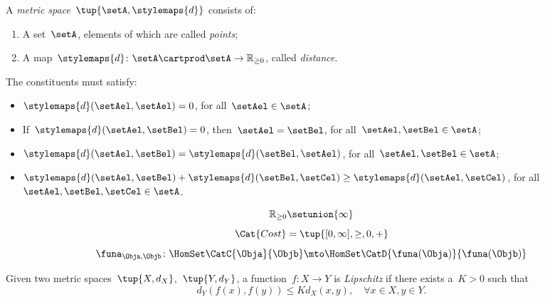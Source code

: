 {\begin{forslides}
\begin{equation*}
		\end{equation*}
		\begin{definition}
			\label{def:metric_space}
			A \emph{metric space}~$\tup{\setA,\stylemaps{d}}$ consists of:
			\begin{enumerate}
				\item A set~$\setA$, elements of which are called \emph{points};
				\item A map~$\stylemaps{d}\colon \setA\cartprod \setA \to \mathbb{R}_{\geq 0}$, called \emph{distance}.
			\end{enumerate}
			The constituents must satisfy:
			\begin{itemize}
				\item $\stylemaps{d}(\setAel,\setAel)=0$, for all~$\setAel\in \setA$;
				\item If~$\stylemaps{d}(\setAel, \setBel)=0$, then~$\setAel=\setBel$, for all~$\setAel,\setBel\in \setA$;
				\item $\stylemaps{d}(\setAel, \setBel)=\stylemaps{d}(\setBel, \setAel)$, for all~$\setAel,\setBel\in \setA$;
				\item $\stylemaps{d}(\setAel, \setBel)+\stylemaps{d}(\setBel, \setCel)\geq \stylemaps{d}(\setAel, \setCel)$, for all~$\setAel,\setBel,\setCel\in \setA$.
			\end{itemize}
		\end{definition}
		\begin{equation*}
			\label{eq:r_with_inft}
			\mathbb{R}_{\geq 0}\setunion \{\infty\}
		\end{equation*}
		\begin{equation*}
			\label{eq:cost_cat}
			\Cat{Cost}=\tup{[0,\infty], \geq, 0, +}
		\end{equation*}
		\begin{equation*}
			\label{eq:enriched_fun_a}
			\funa_{\Obja, \Objb} \colon \HomSet\CatC{\Obja}{\Objb} \mto \HomSet\CatD{\funa(\Obja)}{\funa(\Objb)}
		\end{equation*}
		\begin{definition}
			\label{def:cost_enrich_a}
			Given two metric spaces~$\tup{X,d_X}$,~$\tup{Y,d_Y}$, a function~$f\colon X\to Y$ is \emph{Lipschitz} if there exists a~$K>0$ such that
			\begin{equation}
				d_Y(f(x),f(y))\leq Kd_X(x,y),\quad \forall x\in X,y\in Y.
			\end{equation}
		\end{definition}
	\end{forslides}
}


